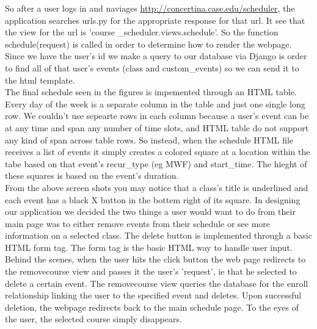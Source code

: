\documentclass[pdftex,12pt,letter]{article}
\begin{document}
\FloatBarrier
\newpage
So after a user logs in and naviages \url{http://concertina.case.edu/scheduler}, the application searches urls.py for the appropriate response for that url. It see that the view for the url is 'course \_scheduler.views.schedule'. So the function schedule(request) is called in order to determine how to render the webpage. Since we have the user's id we make a query to our database via Django is order to find all of that user's events (class and custom\_events) so we can send it to the html template.\\

The final schedule seen in the figures is impemented through an HTML table. Every day of the week is a separate column in the table and just one single long row. We couldn't use sepearte rows in each column because a user's event can be at any time and span any number of time slots, and HTML table do not support any kind of span across table rows. So instead, when the schedule HTML file receives a list of events it simply creates a colored square at a location within the tabe based on that event's recur\_type (eg MWF) and start\_time. The hieght of these squares is based on the event's duration. \\

From the above screen shots you may notice that a class's title is underlined and each event has a black X button in the bottem right of its square. In designing our application we decided the two things a user would want to do from their main page was to either remove events from their schedule or see more information on a selected class. The delete button is implemented through a basic HTML form tag. The form tag is the basic HTML way to handle user input. Behind the scenes, when the user hits the click button the web page redirects to the removecourse view and passes it the user's 'request', ie that he selected to delete a certain event. The removecourse view queries the database for the enroll relationship linking the user to the specified event and deletes. Upon successful deletion, the webpage redirects back to the main schedule page. To the eyes of the user, the selected course simply disappears.\\
\end{document}
